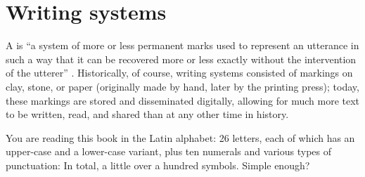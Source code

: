 


\section{Writing systems}


A  is ``a system of more or less permanent marks used to represent an utterance in such a way that it can be
recovered more or less exactly without the intervention of the utterer'' \citep[3]{daniels:bright:96}.   %
Historically, of course, writing systems consisted of markings on clay, stone, or paper (originally made by hand, later by the printing press); today, these markings are  stored and disseminated digitally, allowing for much more text to be written, read, and shared than at any other time in history.


You are reading this book in the Latin alphabet: 26 letters, each of which has an upper-case and a lower-case variant, plus ten numerals and various types of punctuation: In total, a little over a hundred symbols.  Simple enough?

